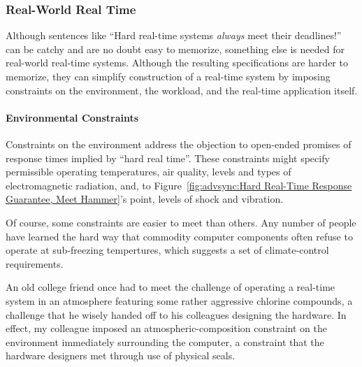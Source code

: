 \subsubsection{Real-World Real Time}
\label{sec:advsync:Real-World Real Time}

Although sentences like ``Hard real-time systems \emph{always} meet
their deadlines!'' can be catchy and are no doubt easy to memorize,
something else is needed for real-world real-time systems.
Although the resulting specifications are
harder to memorize, they can simplify construction of a real-time
system by imposing constraints on the environment, the workload, and
the real-time application itself.

\paragraph{Environmental Constraints}
\label{sec:advsync:Environmental Constraints}

Constraints on the environment address the objection to open-ended
promises of response times implied by ``hard real time''.
These constraints might specify permissible operating temperatures,
air quality, levels and types of electromagnetic radiation, and, to
Figure~\ref{fig:advsync:Hard Real-Time Response Guarantee, Meet Hammer}'s
point, levels of shock and vibration.

Of course, some constraints are easier to meet than others.
Any number of people have learned the hard way that
commodity computer components often refuse to operate at sub-freezing
tempertures, which suggests a set of climate-control requirements.

An old college friend once had to meet the challenge of operating
a real-time system in an atmosphere featuring some rather aggressive
chlorine compounds, a challenge that he wisely handed off to his
colleagues designing the hardware.
In effect, my colleague imposed an atmospheric-composition constraint
on the environment immediately surrounding the computer, a constraint
that the hardware designers met through use of physical seals.

